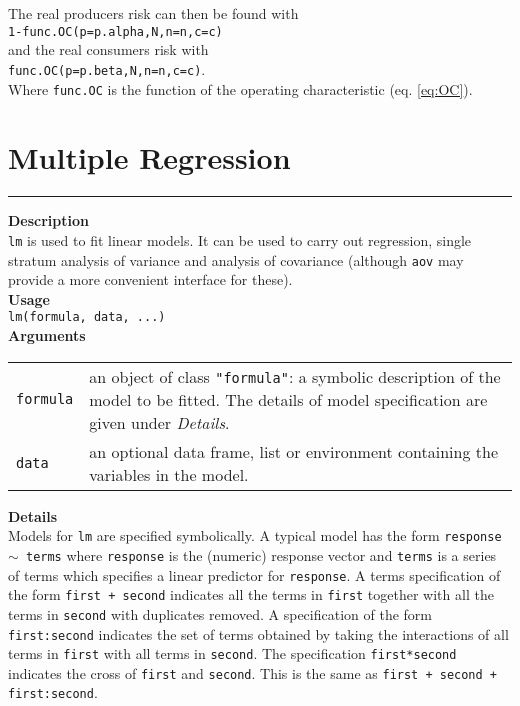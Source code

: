 The real producers risk can then be found with\\
\texttt{1-func.OC(p=p.alpha,N,n=n,c=c)}\\
and the real consumers risk with\\
\texttt{func.OC(p=p.beta,N,n=n,c=c)}.\\
Where \texttt{func.OC} is the function of the operating characteristic (eq. \ref{eq:OC}).


\section{Multiple Regression}
\noindent\rule[\linienAbstand]{\linewidth}{\linienDicke}
\textbf{Description}\\
\texttt{lm} is used to fit linear models. It can be used to carry out regression, single stratum analysis of variance and analysis of covariance (although \texttt{aov} may provide a more convenient interface for these).\\

\textbf{Usage}\\
\texttt{lm(formula, data, ...)}\\

\textbf{Arguments}\\
\begin{table}[H]
  \scriptsize
  \begin{tabularx}{\linewidth}{lX}
    \texttt{formula} & an object of class \texttt{"formula"}: a symbolic description of the model to be fitted. The details of model specification are given under \emph{Details}.\\
    \texttt{data} & an optional data frame, list or environment containing the variables in the model.
  \end{tabularx}
\end{table}
\textbf{Details}\\
Models for \texttt{lm} are specified symbolically. A typical model has the form \texttt{response $\sim$ terms} where \texttt{response} is the (numeric) response vector and \texttt{terms} is a series of terms which specifies a linear predictor for \texttt{response}. A terms specification of the form \texttt{first + second} indicates all the terms in \texttt{first} together with all the terms in \texttt{second} with duplicates removed. A specification of the form \texttt{first:second} indicates the set of terms obtained by taking the interactions of all terms in \texttt{first} with all terms in \texttt{second}. The specification \texttt{first*second} indicates the cross of \texttt{first} and \texttt{second}. This is the same as \texttt{first + second + first:second}.\\

